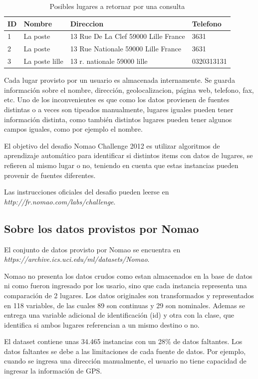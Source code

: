 \documentclass[journal]{IEEEtran}
\begin{document}
\begin{table}[ht!]
\caption{Posibles lugares a retornar por una consulta}
\label{table:example1}
\centering
\begin{tabular}{l | l l l }
ID & Nombre & Direccion & Telefono  \\
\hline
1 & La poste & 13 Rue De La Clef 59000 Lille France & 3631 \\ 
2 & La poste & 13 Rue Nationale 59000 Lille France & 3631 \\
3 & La poste lille & 13 r. nationale 59000 lille & 0320313131 \\
\end{tabular}
\end{table}

Cada lugar provisto por un usuario es almacenada internamente. Se guarda
información sobre el nombre, dirección, geolocalizacion, página web,
telefono, fax, etc. Uno de los inconvenientes es que como los datos
provienen de fuentes distintas o a veces son tipeados manualmente,
lugares iguales pueden tener información distinta, como también
distintos lugares pueden tener algunos campos iguales, como por 
ejemplo el nombre.

El objetivo del desafio Nomao Challenge 2012 es utilizar 
algoritmos de aprendizaje automático para identificar si 
distintos items con datos de lugares, se refieren al mismo
lugar o no, teniendo en cuenta que estas instancias
pueden provenir de fuentes diferentes.

Las instrucciones oficiales del desafio pueden leerse en 
\textit{http://fr.nomao.com/labs/challenge}.

\subsection{Sobre los datos provistos por Nomao}

El conjunto de datos provisto por Nomao se encuentra en
\textit{https://archive.ics.uci.edu/ml/datasets/Nomao}. 

Nomao no presenta los datos crudos como estan almacenados en la 
base de datos ni como fueron ingresado por los usario, sino que  
cada instancia representa una comparación de 
2 lugares. Los datos originales son transformados y representados
en 118 variables, de las cuales 89 son continuas y 29 son
nominales. Ademas se entrega una variable adicional de identificación (id) y
otra con la clase, que identifica si ambos lugares referencian a un mismo
destino o no. 

El dataset contiene unas 34.465 instancias con un 28\% de datos faltantes.
Los datos faltantes se debe a las limitaciones de cada fuente de datos. Por
ejemplo, cuando se ingresa una dirección manualmente, el usuario no tiene
capacidad de ingresar la información de GPS.
\end{document}
